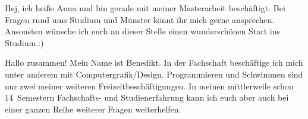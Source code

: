 \begin{multicols}{2}
{
Hej, ich heiße Anna und bin gerade mit meiner Masterarbeit beschäftigt. 
Bei Fragen rund ums Studium und Münster könnt ihr mich gerne ansprechen. 
Ansonsten wünsche ich euch an dieser Stelle einen wunderschönen Start ins Studium.:)
}


{
Hallo zusammen! Mein Name ist Benedikt. In der Fachschaft beschäftige ich mich unter anderem mit Computergrafik/Design. 
Programmieren und Schwimmen sind nur zwei meiner weiteren Freizeitbeschäftigungen. 
In meinen mittlerweile schon 14~Semestern Fachschafts- und Studienerfahrung kann ich euch aber auch bei einer ganzen Reihe weiterer Fragen weiterhelfen.
}



\end{multicols}
